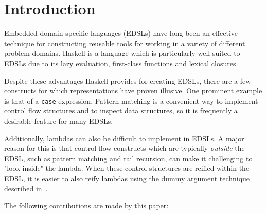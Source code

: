 \documentclass[sigplan,anonymous,review]{acmart}
\newcommand{\ttt}{\texttt}
\newcommand{\showtodos}{}  %
\newenvironment{todo}
  {\ifthenelse{\isundefined{\showtodos}}{\comment}{\begin{tcolorbox}
    \textbf{TODO}:}}
  {\ifthenelse{\isundefined{\showtodos}}{\endcomment}{\end{tcolorbox}}
  }
\begin{document}



\maketitle

\section{Introduction}

Embedded domain specific languages (EDSLs) have long been an effective
technique for constructing reusable tools for working in a variety of
different problem domains. Haskell is a language which is particularly
well-suited to EDSLs due to its lazy evaluation, first-class functions and
lexical closures.

Despite these advantages Haskell provides for creating EDSLs, there are a few
constructs for which representations have proven illusive. One prominent example
is that of a \ttt{case} expression. Pattern matching is a convenient way to
implement control flow structures and to inspect data structures, so it is
frequently a desirable feature for many EDSLs.

Additionally, lambdas can also be difficult to implement in EDSLs. A major reason
for this is that control flow constructs which are typically \textit{outside} the EDSL,
such as pattern matching and tail recursion, can make it challenging to "look inside"
the lambda. When these control structures are reified within the EDSL, it is
easier to also reify lambdas using the dummy argument technique described in~\cite{Elliott:03:CompileDSEL-JFP}.


The following contributions are made by this paper:
\end{document}
